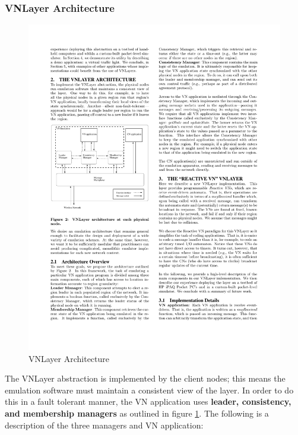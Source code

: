 \documentclass[12pt]{article}
\begin{document}
\subsubsection{VNLayer Architecture}
\begin{figure}
\includegraphics[width=\textwidth]{vnlayerarchitecture.pdf} 
\caption{VNLayer Architecture \cite{vnlayer}}
\label{fig:vnlayerArch}
\end{figure}
The VNLayer abstraction is implemented by the client nodes; this means the emulation software must maintain a consistent view of the layer.  In order to do this in a fault tolerant manner, the VN application uses  {\bf leader, consistency, and membership managers} as outlined in figure \ref{fig:vnlayerArch}.  The following is a description of the three managers and VN application:
\end{document}
